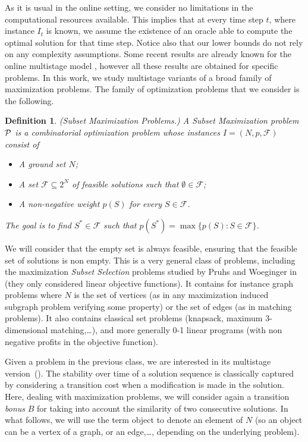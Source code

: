 \documentclass[a4paper]{book}
\newtheorem{definition}{Definition}
\begin{document}
As it is usual in the online setting, we consider no limitations in the computational resources available. This implies that at every time step $t$, where instance $I_t$ is known, we assume the existence of an oracle able to compute the optimal solution for that time step.  Notice also that our lower bounds do not rely on any complexity assumptions. 
Some recent results are already known for the online multistage model  \cite{Bampis+,Gupta}, however all these results are obtained for specific problems.
In this work, we study multistage variants  of a broad family of maximization problems. The family of optimization problems that we consider is the following. 


 
 

\begin{definition}

\emph{(Subset Maximization Problems.)} A Subset Maximization problem $\cal P$ is a combinatorial optimization problem whose instances $I=(N,p,\mathcal{F})$ consist of
\begin{itemize}
    \item A ground set $N$;
    \item A set $\mathcal{F}\subseteq 2^N$ of feasible solutions such that $\emptyset\in\mathcal{F}$;
    \item A non-negative weight $p(S)$ for every $S \in \mathcal{F}$.
\end{itemize}
The goal is to find $S^*\in \mathcal{F}$ such that $p(S^*)=\max\{p(S):S\in\mathcal{F}\}$.
\end{definition}
We will consider that the empty set is always feasible, ensuring that the feasible set of solutions is non empty.
This is a very general class of problems, including the maximization \emph{Subset Selection} problems studied by Pruhs and Woeginger in \cite{Pruhs} (they only considered linear objective functions). It contains for instance graph problems where $N$ is the set of vertices (as in any maximization induced subgraph problem verifying some property) or the set of edges (as in  matching problems). It also contains classical set problems (knapsack, maximum 3-dimensional matching,\dots), and more generally 0-1 linear programs (with non negative profits in the objective function).



Given a problem in the previous class, we are interested in its multistage version~(\cite{Gupta,Eisenstat}).
The stability over time of a solution sequence is classically captured by considering a transition cost when a modification is made in the solution. Here, dealing with maximization problems, we will consider again a transition {\it bonus} $B$ for taking into account the similarity of two consecutive solutions.
In what follows, we will use the term object to denote an element of $N$ (so an object can be a vertex of a graph, or an edge,\dots, depending on the underlying problem). 	%
\end{document}
